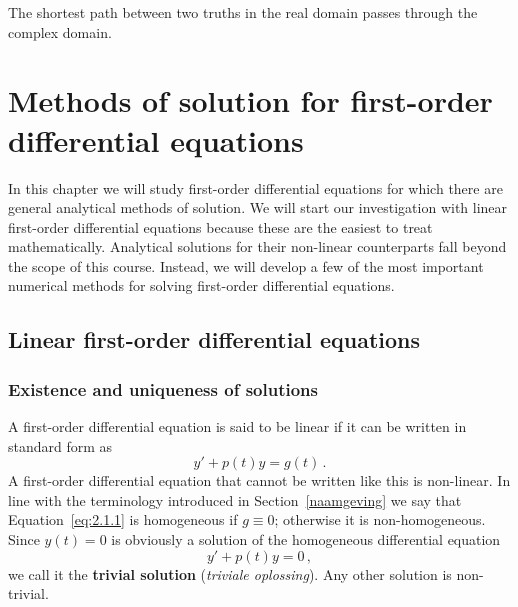 \begin{savequote}[75mm]
The shortest path between two truths in the real domain passes through the complex domain.
\end{savequote}

\chapter{Methods of solution for first-order differential equations}
\label{First_Order_Quan}
\graphicspath{{figures/QuanFirst/}}

In this chapter we will study first-order differential equations for which there are general analytical methods of solution. We will start our investigation with linear first-order differential equations because these are the easiest to treat mathematically. Analytical solutions for their non-linear counterparts fall beyond the scope of this course. Instead, we will develop a few of the most important numerical methods for solving first-order differential equations.


\section{Linear first-order differential equations}
\label{seclineair}
\subsection{Existence and uniqueness of solutions}
A first-order differential equation is said to be  linear if it can be written in standard form as
\begin{equation}\label{eq:2.1.1}
y'+p(t)y=g(t)\,.
\end{equation}
A first-order differential equation that cannot be written like this is non-linear. In line with the terminology introduced in Section~\ref{naamgeving} we say that Equation~\eqref{eq:2.1.1} is homogeneous if $g\equiv0$; otherwise it is non-homogeneous. Since
$y(t)=0$ is obviously a solution of the homogeneous differential equation
$$
y'+p(t)y=0\,,
$$
we call it the \textbf{trivial solution} (\textit{triviale oplossing}). Any  other solution is non-trivial. 


